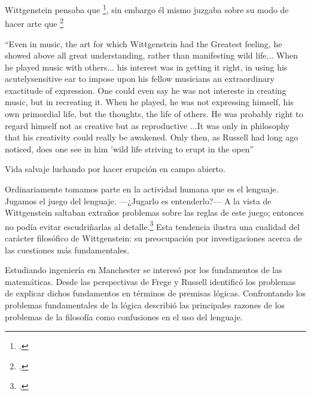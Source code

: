      Wittgenstein
    pensaba que \footcite[p.~43e]{cnv}, sin embargo él mismo juzgaba sobre su modo
    de hacer arte que  \footcite[p.~29e]{cnv}



    ``Even in music, the art for which Wittgenstein had the Greatest
      feeling, he showed above all great understanding, rather than manifesting
      wild life... When he played music with others... his interest was in getting
      it right, in using his acutelysensitive ear to impose upon his fellow
      musicians an extraordinary exactitude of expression. One could even say he
      was not intereste in creating music, but in recreating it. When he played,
      he was not expressing himself, his own primordial life, but the thoughts,
      the life of others. He was probably right to regard himself not as creative
      but as reproductive ...It was only in philosophy that his creativity could
      really be awakened. Only then, as Russell had long ago noticed, does one see
      in him 'wild life striving to erupt in the open''


Vida salvaje luchando por hacer erupción en campo abierto.

    Ordinariamente tomamos parte en la actividad humana que es el
    lenguaje. Jugamos el juego del lenguaje. ---¿Jugarlo es entenderlo?--- 
    A la vista de Wittgenstein saltaban extraños problemas sobre las reglas de este
    juego; entonces no podía evitar escudriñarlas al
    detalle.\footcite[cf.~][loc.7099]{monk} 
    Esta tendencia ilustra una cualidad del carácter filosófico de Wittgenstein: su
    preocupación por investigaciones acerca de las cuestiones más fundamentales. 

    Estudiando ingeniería en Manchester se interesó por los fundamentos de las
    matemáticas. Desde las perspectivas de Frege y Russell identificó los problemas
    de explicar dichos fundamentos en términos de premisas lógicas. 
    Confrontando los problemas fundamentales de la lógica 
    describió las principales razones de los problemas de la filosofía como
    confusiones en el uso del lenguaje. 

